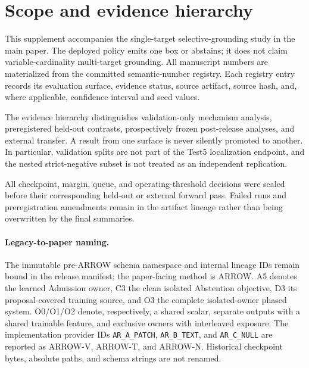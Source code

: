 \section{Scope and evidence hierarchy}
\label{sup:scope}

This supplement accompanies the single-target selective-grounding study in
the main paper.  The deployed policy emits one box or abstains; it does not
claim variable-cardinality multi-target grounding.  All manuscript numbers
are materialized from the committed semantic-number registry.  Each registry
entry records its evaluation surface, evidence status, source artifact,
source hash, and, where applicable, confidence interval and seed values.

The evidence hierarchy distinguishes validation-only mechanism analysis,
preregistered held-out contrasts, prospectively frozen post-release analyses,
and external transfer.  A result from one surface is never silently promoted
to another.  In particular, validation splits are not part of the Test5
localization endpoint, and the nested strict-negative subset is not treated as
an independent replication.

All checkpoint, margin, queue, and operating-threshold decisions were sealed
before their corresponding held-out or external forward pass.  Failed runs
and preregistration amendments remain in the artifact lineage rather than
being overwritten by the final summaries.

\paragraph{Legacy-to-paper naming.}
The immutable pre-ARROW schema namespace and internal lineage IDs remain
bound in the release manifest; the paper-facing method is ARROW.  A5 denotes
the learned Admission owner, C3 the clean isolated Abstention objective, D3
its proposal-covered training source, and O3 the complete isolated-owner
phased system.  O0/O1/O2 denote,
respectively, a shared scalar, separate outputs with a shared trainable
feature, and exclusive owners with interleaved exposure.  The implementation
provider IDs \texttt{AR\_A\_PATCH}, \texttt{AR\_B\_TEXT}, and
\texttt{AR\_C\_NULL} are reported as ARROW-V, ARROW-T, and ARROW-N.  Historical
checkpoint bytes, absolute paths, and schema strings are not renamed.

